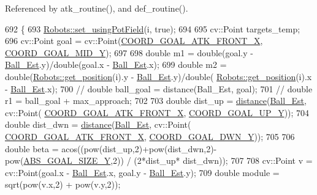 Referenced by atk\+\_\+routine(), and def\+\_\+routine().


\begin{DoxyCode}
692                                      \{
693     \hyperlink{class_robots_a51288c53411bda98c5f9cd05f6ef2a82}{Robots::set\_usingPotField}(i, \textcolor{keyword}{true});
694 
695     cv::Point targets\_temp;
696     cv::Point goal = cv::Point(\hyperlink{namespace_c_o_n_s_t_a8788c5d888fd3e9d9382502aee24afee}{COORD\_GOAL\_ATK\_FRONT\_X}, 
      \hyperlink{namespace_c_o_n_s_t_a227a51bc8809f1391dc096eafb6b1d85}{COORD\_GOAL\_MID\_Y});
697 
698     \textcolor{keywordtype}{double} m1 = double(goal.y - \hyperlink{class_strategy_ae629b11b862d24dba3fb3322659e439e}{Ball\_Est}.y)/double(goal.x - \hyperlink{class_strategy_ae629b11b862d24dba3fb3322659e439e}{Ball\_Est}.x);
699     \textcolor{keywordtype}{double} m2 = double(\hyperlink{class_robots_a1fca8f2f5070176faa6ba1efa2f1ff14}{Robots::get\_position}(i).y - \hyperlink{class_strategy_ae629b11b862d24dba3fb3322659e439e}{Ball\_Est}.y)/double(
      \hyperlink{class_robots_a1fca8f2f5070176faa6ba1efa2f1ff14}{Robots::get\_position}(i).x - \hyperlink{class_strategy_ae629b11b862d24dba3fb3322659e439e}{Ball\_Est}.x);
700     \textcolor{comment}{// double ball\_goal = distance(Ball\_Est, goal);}
701     \textcolor{comment}{// double r1 = ball\_goal + max\_approach;}
702 
703     \textcolor{keywordtype}{double} dist\_up = \hyperlink{class_strategy_aacce05caed71553c4efd2d28c9c3aa39}{distance}(\hyperlink{class_strategy_ae629b11b862d24dba3fb3322659e439e}{Ball\_Est}, cv::Point(
      \hyperlink{namespace_c_o_n_s_t_a8788c5d888fd3e9d9382502aee24afee}{COORD\_GOAL\_ATK\_FRONT\_X}, \hyperlink{namespace_c_o_n_s_t_ab1e77f62ff88d04c9aac407f4405add2}{COORD\_GOAL\_UP\_Y}));
704     \textcolor{keywordtype}{double} dist\_dwn = \hyperlink{class_strategy_aacce05caed71553c4efd2d28c9c3aa39}{distance}(\hyperlink{class_strategy_ae629b11b862d24dba3fb3322659e439e}{Ball\_Est}, cv::Point(
      \hyperlink{namespace_c_o_n_s_t_a8788c5d888fd3e9d9382502aee24afee}{COORD\_GOAL\_ATK\_FRONT\_X}, \hyperlink{namespace_c_o_n_s_t_a97382a534273f1ca10b7cdf29fab9d0a}{COORD\_GOAL\_DWN\_Y}));
705 
706     \textcolor{keywordtype}{double} beta = acos((pow(dist\_up,2)+pow(dist\_dwn,2)-pow(\hyperlink{namespace_c_o_n_s_t_a5461381c3d71d5f77ef87d4e8c2b05df}{ABS\_GOAL\_SIZE\_Y},2)) / (2*dist\_up*
      dist\_dwn));
707 
708     cv::Point v = cv::Point(goal.x - \hyperlink{class_strategy_ae629b11b862d24dba3fb3322659e439e}{Ball\_Est}.x, goal.y - \hyperlink{class_strategy_ae629b11b862d24dba3fb3322659e439e}{Ball\_Est}.y);
709     \textcolor{keywordtype}{double} module = sqrt(pow(v.x,2) + pow(v.y,2));

\end{DoxyCode}
